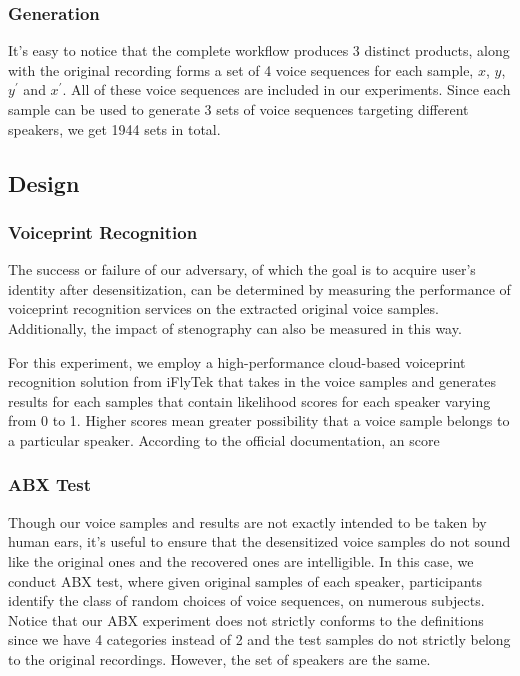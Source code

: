 \documentclass[journal]{IEEEtran} %
\begin{document}
\subsubsection{Generation}

It's easy to notice that the complete workflow produces 3 distinct products, along with the original recording forms a set of 4 voice sequences for each sample, $x$, $y$, $y^{\prime}$ and $x^{\prime}$. All of these voice sequences are included in our experiments. Since each sample can be used to generate 3 sets of voice sequences targeting different speakers, we get 1944 sets in total.

\subsection{Design}

\subsubsection{Voiceprint Recognition}

The success or failure of our adversary, of which the goal is to acquire user's identity after desensitization, can be determined by measuring the performance of voiceprint recognition services on the extracted original voice samples. Additionally, the impact of stenography can also be measured in this way.

For this experiment, we employ a high-performance cloud-based voiceprint recognition solution from iFlyTek that takes in the voice samples and generates results for each samples that contain likelihood scores for each speaker varying from 0 to 1. Higher scores mean greater possibility that a voice sample belongs to a particular speaker. According to the official documentation, an score

\subsubsection{ABX Test}

Though our voice samples and results are not exactly intended to be taken by human ears, it's useful to ensure that the desensitized voice samples do not sound like the original ones and the recovered ones are intelligible. In this case, we conduct ABX test, where given original samples of each speaker, participants identify the class of random choices of voice sequences, on numerous subjects. Notice that our ABX experiment does not strictly conforms to the definitions since we have 4 categories instead of 2 and the test samples do not strictly belong to the original recordings. However, the set of speakers are the same.
\end{document}
